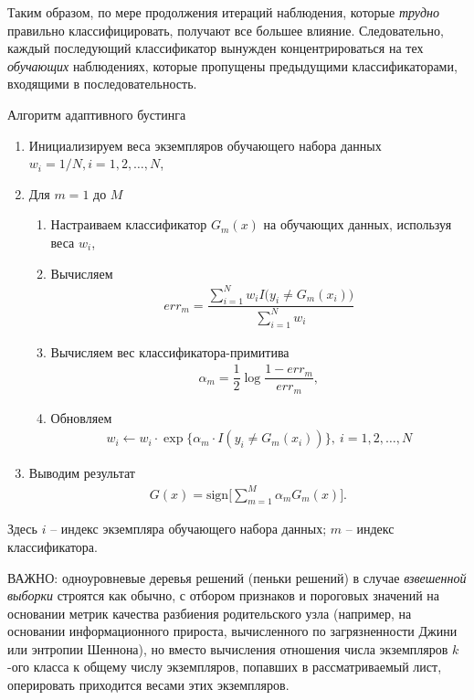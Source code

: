 \documentclass[%
	11pt,
	a4paper,
	utf8,
		]{article}
\begin{document}
Таким образом, по мере продолжения итераций наблюдения, которые \emph{трудно} правильно классифицировать, получают все б\emph{о}льшее влияние. Следовательно, каждый последующий классификатор вынужден концентрироваться на тех \emph{обучающих} наблюдениях, которые пропущены предыдущими классификаторами, входящими в последовательность.

Алгоритм адаптивного бустинга
\begin{enumerate}
	\item Инициализируем веса экземпляров обучающего набора данных $ w_i = 1/N, i = 1, 2, \ldots, N $,
	
	\item Для $ m = 1 $ до $ M $
	\begin{enumerate}
		\item Настраиваем классификатор $ G_m(x) $ на обучающих данных, используя веса $ w_i $,
		
		\item Вычисляем
\begin{align*}
	err_m = \dfrac{ \sum\limits_{i=1}^{N} w_i I\big(y_i \neq G_m(x_i)\big) }{ \sum\limits_{i=1}^{N} w_i}
\end{align*}

        \item Вычисляем вес классификатора-примитива
\begin{align*}
	\alpha_m = \dfrac{1}{2} \log \dfrac{ 1- err_m }{ err_m },
\end{align*}

        \item Обновляем
\begin{align*}
	w_i \leftarrow w_i \cdot \exp \{ \alpha_m \cdot I(y_i \neq G_m(x_i)) \}, \ i = 1, 2, \ldots, N
\end{align*}
	\end{enumerate}

    \item Выводим результат
\begin{align*}
	G(x) = \text{sign} \big[ \sum_{m=1}^{M} \alpha_m G_m(x) \big].
\end{align*}
\end{enumerate}

Здесь $ i $ -- индекс экземпляра обучающего набора данных; $ m $ -- индекс классификатора.

ВАЖНО: одноуровневые деревья решений (пеньки решений) в случае \emph{взвешенной выборки} строятся как обычно, с отбором признаков и пороговых значений на основании метрик качества разбиения родительского узла (например, на основании информационного прироста, вычисленного по загрязненности Джини или энтропии Шеннона), но вместо вычисления отношения числа экземпляров $ k $-ого класса к общему числу экземпляров, попавших в рассматриваемый лист, оперировать приходится весами этих экземпляров.
\end{document}
